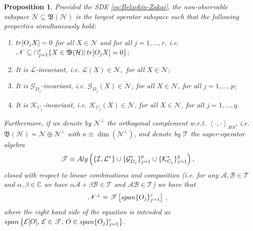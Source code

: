 \documentclass[aihp,12pt]{imsart}
\newcommand{\Ac}{\mathcal{A}}
\newcommand{\Bc}{\mathcal{B}}
\newcommand{\Ec}{\mathcal{E}}
\newcommand{\Gc}{\mathcal{G}}
\newcommand{\Hc}{\mathcal{H}}
\newcommand{\Ic}{\mathcal{I}}
\newcommand{\Kc}{\mathcal{K}}
\newcommand{\Lc}{\mathcal{L}}
\newcommand{\Ns}{\mathscr{N}}
\newcommand{\Ts}{\mathscr{T}}
\newcommand{\Cb}{\mathbb{C}}
\newcommand{\Bf}{\mathfrak{B}}
\newcommand{\tr}{{\rm tr}}
\newcommand{\Span}{{\rm span}}
\newcommand{\inner}[2]{\left< #1,#2 \right>}
\theoremstyle{theorem}
\newtheorem{proposition}{Proposition}
\theoremstyle{definition}
\theoremstyle{remark}
\begin{document}
\begin{proposition}
        \label{prop:non-observable}
    \label{prop:observable_construction}
    Provided the SDE \eqref{eq:Belavkin-Zakai}, the non-observable subspace  $\Ns\subseteq\Bf(\Hc)$ is the largest operator subspace such that the following properties simultaneously hold: 
    \begin{enumerate}
        \item $\tr[O_jX]=0$ for all $X\in\Ns$ and for all $j=1,\dots,r$, i.e. $\Ns\subseteq\cap_{j=1}^r\{X\in\Bf(\Hc)|\, \tr[O_j X]=0\}$;
        \item It is $\Lc$-invariant, i.e. $\Lc(X)\in\Ns,$ for all $ X\in\Ns$;
        \item It is $\Gc_{D_j}$-invariant, i.e. \(\Gc_{D_j}(X)\in\Ns\), for all $X\in\Ns$, for all $j=1,\dots,p$;
        \item It is $\Kc_{C_j}$-invariant, i.e. \(\Kc_{C_j}(X)\in\Ns\), for all $X\in\Ns$, for all $j=1,\dots,q$.
    \end{enumerate}     

    Furthermore, if we denote by $\Ns^\perp$ the orthogonal complement w.r.t. $\inner{\cdot}{\cdot}_{HS}$, i.e. $\Bf(\Hc)=\Ns\oplus\Ns^\perp$ with $\kappa\equiv\dim(\Ns^\perp)$, and denote by $\Ts$ the super-operator algebra $$\Ts \equiv {\rm Alg}\left(\{\Ic, {\Lc}^*\}\cup\{\Gc_{D_j}^*\}_{j=1}^p \cup\{\Kc_{C_j}^*\}_{j=1}^q \right),$$ closed with respect to linear combinations and composition (i.e. for any $\Ac,\Bc\in\Ts$ and $\alpha,\beta\in\Cb$ we have $\alpha\Ac+\beta\Bc\in\Ts$ and $\Ac\Bc\in\Ts$) we have that 
    \begin{equation}
        \Ns^\perp = \Ts \left[\Span\{O_j\}_{j=1}^r\right]\,,
        \label{eq:observable_diffusive}
    \end{equation}
    where the right hand side of the equation is intended as $\Span\left\{\Ec[O], \, \Ec\in\Ts, \, O\in\Span\{O_j\}_{j=1}^r\right\}$.
\end{proposition}
\end{document}
